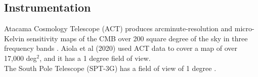 \documentclass{article}
\begin{document}
\subsection{Instrumentation}

Atacama Cosmology Telescope (ACT) produces arcminute-resolution and micro-Kelvin sensitivity maps of the CMB over 200 square degree of the sky in three frequency bands \cite{kosowsky2003atacama}. Aiola et al (2020) used ACT data to cover a map of over 17,000 deg$^2$, and it has a 1 degree field of view. 
\\

The South Pole Telescope (SPT-3G) has a field of view of 1 degree \cite{ruhl2004south}. 


\newpage
\printbibliography
\end{document}
